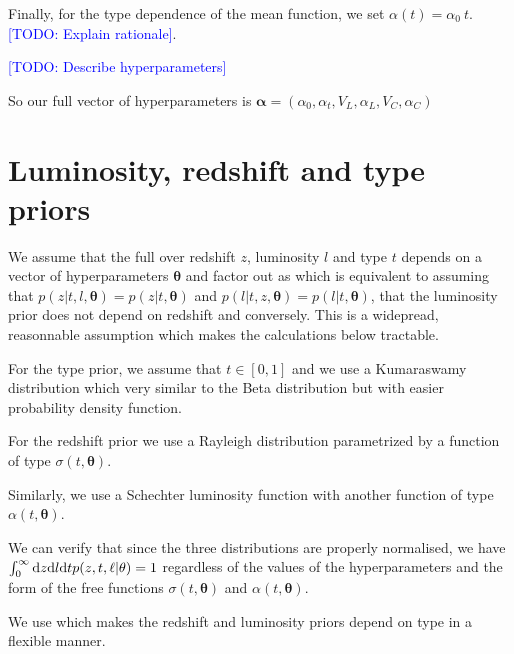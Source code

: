 \documentclass[aps,prd,showpacs,superscriptaddress,groupedaddress]{revtex4}  %
\newcommand{\todo}[1]{\textcolor{blue}{[TODO: #1]}}
\begin{document}
Finally, for the type dependence of the mean function, we set $\alpha(t) = \alpha_0 \ t$. \todo{Explain rationale}.

\todo{Describe hyperparameters}

So our full vector of hyperparameters is $\bm{\alpha} = (\alpha_0, \alpha_t, V_L,  \alpha_L, V_C, \alpha_C)$

\section{Luminosity, redshift and type priors}

We assume that the full over redshift $z$, luminosity $l$ and type $t$ depends on a vector of hyperparameters $\bm{\theta}$ and   factor out as
which is equivalent to assuming that $p(z | t, l, \bm{\theta}) = p(z | t, \bm{\theta})$ and $p(l | t, z, \bm{\theta})=p(l | t, \bm{\theta})$, \ie that the luminosity prior does not depend on redshift and conversely. 
This is a widepread, reasonnable assumption which makes the calculations below tractable.

For the type prior, we assume that $t\in[0,1]$ and we use a Kumaraswamy distribution
which very similar to the Beta distribution but with easier probability density function.

For the redshift prior we use a Rayleigh distribution
parametrized by a function of type $\sigma(t,\bm{\theta})$.

Similarly, we use a Schechter luminosity function
with another function of type $\alpha(t,\bm{\theta})$.

We can verify that since the three distributions are properly normalised, we have $\int_0^\infty\d z\d l \d t p(z,t,\ell | \vec{\theta}) = 1$ regardless of the values of the hyperparameters and the form of the free functions $\sigma(t,\bm{\theta})$ and $\alpha(t,\bm{\theta})$.

We use 
which makes the redshift and luminosity priors depend on type in a flexible manner.
\end{document}
